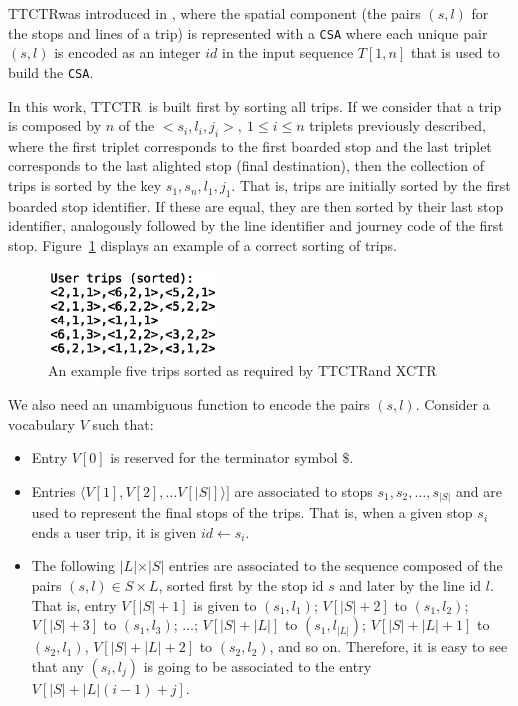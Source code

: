 \documentclass[runningheads]{llncs}
\newcommand{\ctr}{XCTR}
\newcommand{\ttctr}{TTCTR}
\begin{document}
\ttctr was introduced in \cite{brisaboa2018new}, where the spatial component (the pairs $(s,l)$ for the stops and lines of a trip) is represented with a \texttt{CSA} where each unique pair $(s,l)$ is encoded as an integer $id$ in the input sequence $T[1,n]$ that is used to build the \texttt{CSA}.

In this work, \ttctr~is built first by sorting all trips. If we consider that a trip is composed by $n$ of the $<s_i,l_i,j_i>,~1\leq i\leq n$ triplets previously described, where the first triplet corresponds to the first boarded stop and the last triplet corresponds to the last alighted stop (final destination), then the collection of trips is sorted by the key $s_1,s_n,l_1,j_1$. That is, trips are initially sorted by the first boarded stop identifier. If these are equal, they are then sorted by their last stop identifier, analogously followed by the line identifier and journey code of the first stop. Figure~\ref{fig:example_trips} displays an example of a correct sorting of trips.

\begin{figure}[hbt!]
\includegraphics[width=0.4\textwidth]{example_trips.eps}
\caption{An example five trips sorted as required by \ttctr and \ctr}
\label{fig:example_trips}
\end{figure}

We also need an unambiguous function to encode the pairs $(s,l)$. Consider a vocabulary $V$ such that:
\begin{itemize}
	\item Entry $V[0]$ is reserved for the terminator symbol $\$$.
	\item Entries $\langle V[1],V[2], \dots V[|S|]\rangle]$ are associated to stops $s_1,s_2,\dots, s_{|S|}$ and are used to represent the final stops of the trips. That is, when a given stop $s_i$ ends a user trip, it is given $id \leftarrow s_i$.
	\item The following $|L|$$\times$$|S|$ entries are associated to the sequence composed of the pairs $(s,l) \in S\times L$, sorted first by the stop id $s$ and later by the line id $l$. That is, entry $V[|S|+1]$ is given to $(s_1,l_1)$; $V[|S|+2]$ to $(s_1,l_2)$; $V[|S|+3]$ to $(s_1,l_3)$; $\dots$; $V[|S|+|L|]$ to $(s_1,l_{|L|})$;  $V[|S|+|L|+1]$ to $(s_2, l_1)$, $V[|S|+|L|+2]$ to $(s_2, l_2)$, and so on. Therefore, it is easy to see that any $(s_i,l_j)$ is going to be associated to the entry $V[|S|+ |L|(i-1) + j]$.
\end{itemize}
\end{document}
